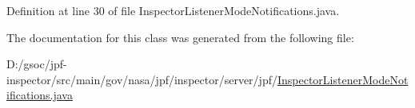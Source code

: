 Definition at line 30 of file Inspector\+Listener\+Mode\+Notifications.\+java.



The documentation for this class was generated from the following file\+:\begin{DoxyCompactItemize}
\item 
D\+:/gsoc/jpf-\/inspector/src/main/gov/nasa/jpf/inspector/server/jpf/\hyperlink{_inspector_listener_mode_notifications_8java}{Inspector\+Listener\+Mode\+Notifications.\+java}\end{DoxyCompactItemize}
